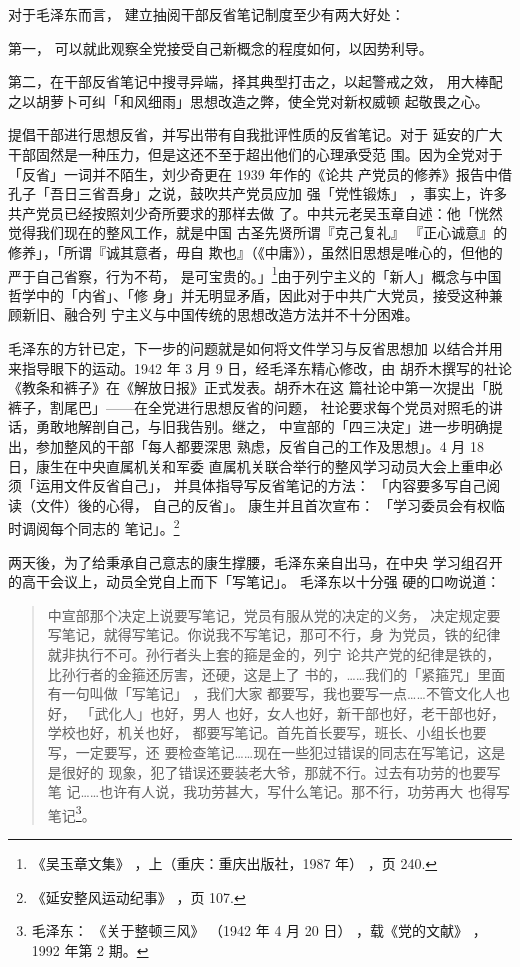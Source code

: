 对于毛泽东而言，
建立抽阅干部反省笔记制度至少有两大好处：

第一，
可以就此观察全党接受自己新概念的程度如何，以因势利导。

第二，在干部反省笔记中搜寻异端，择其典型打击之，以起警戒之效，
用大棒配之以胡萝卜可纠「和风细雨」思想改造之弊，使全党对新权威顿
起敬畏之心。

提倡干部进行思想反省，并写出带有自我批评性质的反省笔记。对于
延安的广大干部固然是一种压力，但是这还不至于超出他们的心理承受范
围。因为全党对于「反省」一词并不陌生，刘少奇更在 1939 年作的《论共
产党员的修养》报告中借孔子「吾日三省吾身」之说，鼓吹共产党员应加
强「党性锻炼」
，事实上，许多共产党员已经按照刘少奇所要求的那样去做
了。中共元老吴玉章自述：他「恍然觉得我们现在的整风工作，就是中国
古圣先贤所谓『克己复礼』
『正心诚意』的修养」，「所谓『诚其意者，毋自
欺也』（《中庸》），虽然旧思想是唯心的，但他的严于自己省察，行为不苟，
是可宝贵的。」\footnote{《吴玉章文集》
，上（重庆：重庆出版社，1987 年）
，页 240.}由于列宁主义的「新人」概念与中国哲学中的「内省」、「修
身」并无明显矛盾，因此对于中共广大党员，接受这种兼顾新旧、融合列
宁主义与中国传统的思想改造方法并不十分困难。

毛泽东的方针已定，下一步的问题就是如何将文件学习与反省思想加
以结合并用来指导眼下的运动。1942 年 3 月 9 日，经毛泽东精心修改，由
胡乔木撰写的社论《教条和裤子》在《解放日报》正式发表。胡乔木在这
篇社论中第一次提出「脱裤子，割尾巴」——在全党进行思想反省的问题，
社论要求每个党员对照毛的讲话，勇敢地解剖自己，与旧我告别。继之，
中宣部的「四三决定」进一步明确提出，参加整风的干部「每人都要深思
熟虑，反省自己的工作及思想」。4 月 18 日，康生在中央直属机关和军委
直属机关联合举行的整风学习动员大会上重申必须「运用文件反省自己」，
并具体指导写反省笔记的方法：
「内容要多写自己阅读（文件）後的心得，
自己的反省」。
康生并且首次宣布：
「学习委员会有权临时调阅每个同志的
笔记」。\footnote{《延安整风运动纪事》
，页 107.} 

两天後，为了给秉承自己意志的康生撑腰，毛泽东亲自出马，在中央
学习组召开的高干会议上，动员全党自上而下「写笔记」。
毛泽东以十分强
硬的口吻说道：
\begin{quote}
{\fzwkai 中宣部那个决定上说要写笔记，党员有服从党的决定的义务，
决定规定要写笔记，就得写笔记。你说我不写笔记，那可不行，身
为党员，铁的纪律就非执行不可。孙行者头上套的箍是金的，列宁
论共产党的纪律是铁的，比孙行者的金箍还厉害，还硬，这是上了
书的，……我们的「紧箍咒」里面有一句叫做「写笔记」
，我们大家
都要写，我也要写一点……不管文化人也好，
「武化人」也好，男人
也好，女人也好，新干部也好，老干部也好，学校也好，机关也好，
都要写笔记。首先首长要写，班长、小组长也要写，一定要写，还
要检查笔记……现在一些犯过错误的同志在写笔记，这是是很好的
现象，犯了错误还要装老大爷，那就不行。过去有功劳的也要写笔
记……也许有人说，我功劳甚大，写什么笔记。那不行，功劳再大
也得写笔记\footnote{毛泽东：
《关于整顿三风》
（1942 年 4 月 20 日）
，载《党的文献》
，1992 年第 2 期。}。} 
\end{quote}

